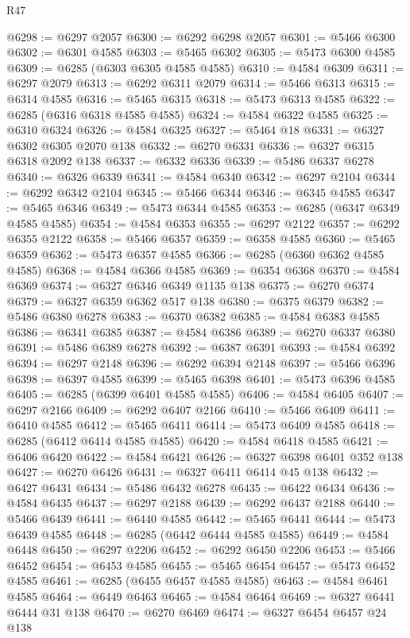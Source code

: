 \begin{lexlean}{R47}
\begin{coremodule}
@6298 := @6297 @2057
@6300 := @6292 @6298 @2057
@6301 := @5466 @6300
@6302 := @6301 @4585
@6303 := @5465 @6302
@6305 := @5473 @6300 @4585
@6309 := @6285 (@6303 @6305 @4585 @4585)
@6310 := @4584 @6309
@6311 := @6297 @2079
@6313 := @6292 @6311 @2079
@6314 := @5466 @6313
@6315 := @6314 @4585
@6316 := @5465 @6315
@6318 := @5473 @6313 @4585
@6322 := @6285 (@6316 @6318 @4585 @4585)
@6324 := @4584 @6322 @4585
@6325 := @6310 @6324
@6326 := @4584 @6325
@6327 := @5464 @18
@6331 := @6327 @6302 @6305 @2070 @138
@6332 := @6270 @6331
@6336 := @6327 @6315 @6318 @2092 @138
@6337 := @6332 @6336
@6339 := @5486 @6337 @6278
@6340 := @6326 @6339
@6341 := @4584 @6340
@6342 := @6297 @2104
@6344 := @6292 @6342 @2104
@6345 := @5466 @6344
@6346 := @6345 @4585
@6347 := @5465 @6346
@6349 := @5473 @6344 @4585
@6353 := @6285 (@6347 @6349 @4585 @4585)
@6354 := @4584 @6353
@6355 := @6297 @2122
@6357 := @6292 @6355 @2122
@6358 := @5466 @6357
@6359 := @6358 @4585
@6360 := @5465 @6359
@6362 := @5473 @6357 @4585
@6366 := @6285 (@6360 @6362 @4585 @4585)
@6368 := @4584 @6366 @4585
@6369 := @6354 @6368
@6370 := @4584 @6369
@6374 := @6327 @6346 @6349 @1135 @138
@6375 := @6270 @6374
@6379 := @6327 @6359 @6362 @517 @138
@6380 := @6375 @6379
@6382 := @5486 @6380 @6278
@6383 := @6370 @6382
@6385 := @4584 @6383 @4585
@6386 := @6341 @6385
@6387 := @4584 @6386
@6389 := @6270 @6337 @6380
@6391 := @5486 @6389 @6278
@6392 := @6387 @6391
@6393 := @4584 @6392
@6394 := @6297 @2148
@6396 := @6292 @6394 @2148
@6397 := @5466 @6396
@6398 := @6397 @4585
@6399 := @5465 @6398
@6401 := @5473 @6396 @4585
@6405 := @6285 (@6399 @6401 @4585 @4585)
@6406 := @4584 @6405
@6407 := @6297 @2166
@6409 := @6292 @6407 @2166
@6410 := @5466 @6409
@6411 := @6410 @4585
@6412 := @5465 @6411
@6414 := @5473 @6409 @4585
@6418 := @6285 (@6412 @6414 @4585 @4585)
@6420 := @4584 @6418 @4585
@6421 := @6406 @6420
@6422 := @4584 @6421
@6426 := @6327 @6398 @6401 @352 @138
@6427 := @6270 @6426
@6431 := @6327 @6411 @6414 @45 @138
@6432 := @6427 @6431
@6434 := @5486 @6432 @6278
@6435 := @6422 @6434
@6436 := @4584 @6435
@6437 := @6297 @2188
@6439 := @6292 @6437 @2188
@6440 := @5466 @6439
@6441 := @6440 @4585
@6442 := @5465 @6441
@6444 := @5473 @6439 @4585
@6448 := @6285 (@6442 @6444 @4585 @4585)
@6449 := @4584 @6448
@6450 := @6297 @2206
@6452 := @6292 @6450 @2206
@6453 := @5466 @6452
@6454 := @6453 @4585
@6455 := @5465 @6454
@6457 := @5473 @6452 @4585
@6461 := @6285 (@6455 @6457 @4585 @4585)
@6463 := @4584 @6461 @4585
@6464 := @6449 @6463
@6465 := @4584 @6464
@6469 := @6327 @6441 @6444 @31 @138
@6470 := @6270 @6469
@6474 := @6327 @6454 @6457 @24 @138

\end{coremodule}
\end{lexlean}
